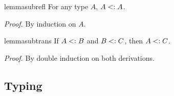 \begin{restatable}{lemma}{subrefl}
  \label{lemma:subrefl}
  For any type $A$, $A <: A$.
\end{restatable}%
\noindent \emph{Proof.} By induction on $A$.
\begin{restatable}{lemma}{subtrans}
  \label{lemma:subtrans}
  If $A <: B$ and $B <: C$, then $A <: C$.
\end{restatable}%
\noindent \emph{Proof.} By double induction on both derivations.
%
%
\subsection{Typing}

\begin{comment}
\begin{figure}[!t]
  \begin{mathpar}
    \formwf \\ \rulewfint \and \rulewfvardis \and \rulewffun \and \rulewfrec \and 
    \rulewftop \and \rulewfforalldis \and \rulewfinterdis 
  \end{mathpar}

  \caption{Well-formedness rules for types of \name.}
  \label{fig:wf}
\end{figure}
\end{comment}


